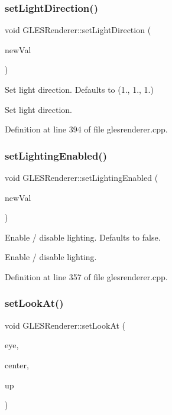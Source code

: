 \mbox{\label{class_g_l_e_s_renderer_a4f755a8549d3ecbb2a40cabe56974c5f}} 
\subsubsection{\texorpdfstring{setLightDirection()}{setLightDirection()}}
{\footnotesize\ttfamily void G\+L\+E\+S\+Renderer\+::set\+Light\+Direction (\begin{DoxyParamCaption}\item[{const Q\+Vector3D \&}]{new\+Val }\end{DoxyParamCaption})}

Set light direction. Defaults to (1., 1., 1.)

Set light direction. 

Definition at line 394 of file glesrenderer.\+cpp.

\mbox{\label{class_g_l_e_s_renderer_ae6e3531d53ffdc334688eec3feaf9e77}} 
\subsubsection{\texorpdfstring{setLightingEnabled()}{setLightingEnabled()}}
{\footnotesize\ttfamily void G\+L\+E\+S\+Renderer\+::set\+Lighting\+Enabled (\begin{DoxyParamCaption}\item[{bool}]{new\+Val }\end{DoxyParamCaption})}

Enable / disable lighting. Defaults to false.

Enable / disable lighting. 

Definition at line 357 of file glesrenderer.\+cpp.

\mbox{\label{class_g_l_e_s_renderer_a180fe52b28553039f83b07157b962c3e}} 
\subsubsection{\texorpdfstring{setLookAt()}{setLookAt()}}
{\footnotesize\ttfamily void G\+L\+E\+S\+Renderer\+::set\+Look\+At (\begin{DoxyParamCaption}\item[{const Q\+Vector3D \&}]{eye,  }\item[{const Q\+Vector3D \&}]{center,  }\item[{const Q\+Vector3D \&}]{up }\end{DoxyParamCaption})}

